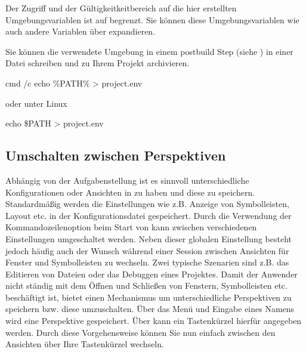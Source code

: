 
Der Zugriff und der Gültigkeitkeitbereich auf die hier erstellten Umgebungsvariablen ist auf \codeblocks begrenzt. Sie können diese Umgebungsvariablen wie auch andere \codeblocks Variablen über  expandieren.



Sie können die verwendete Umgebung in einem postbuild Step (siehe ) in einer Datei  schreiben und zu Ihrem Projekt archivieren.

\begin{cmd}
cmd /c echo \%PATH\%  > project.env
\end{cmd}

oder unter Linux

\begin{cmd}
echo \$PATH > project.env
\end{cmd}

\subsection{Umschalten zwischen Perspektiven}

Abhängig von der Aufgabenstellung ist es sinnvoll unterschiedliche Konfigurationen oder Ansichten in \codeblocks zu haben und diese zu speichern. Standardmäßig werden die Einstellungen wie z.B. Anzeige von Symbolleisten, Layout etc. in der Konfigurationsdatei  gespeichert. Durch die Verwendung der Kommandozeilenoption  beim Start von \codeblocks kann zwischen verschiedenen Einstellungen umgeschaltet werden. Neben dieser globalen Einstellung besteht jedoch häufig auch der Wunsch während einer Session zwischen Ansichten für Fenster und Symbolleisten zu wechseln. Zwei typische Szenarien sind z.B. das Editieren von Dateien oder das Debuggen eines Projektes. Damit der Anwender nicht ständig mit dem Öffnen und Schließen von Fenstern, Symbolleisten etc. beschäftigt ist, bietet \codeblocks einen Mechanismus um unterschiedliche Perspektiven zu speichern bzw. diese umzuschalten. Über das Menü  und Eingabe eines Namens  wird eine Perspektive gespeichert. Über  kann ein Tastenkürzel hierfür angegeben werden. Durch diese Vorgehensweise können Sie nun einfach zwischen den Ansichten über Ihre Tastenkürzel wechseln.

